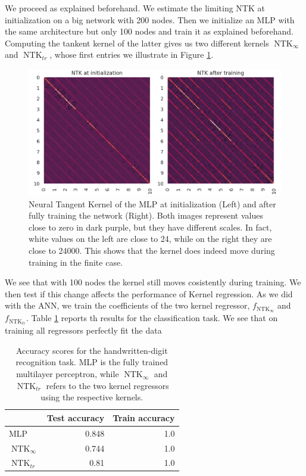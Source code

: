 \documentclass[11pt,notitlepage]{article}
\numberwithin{equation}{section}
\DeclareMathOperator{\NTK}{NTK}
\theoremstyle{remark}
\theoremstyle{definition}
\begin{document}
	We proceed as explained beforehand.
	We estimate the limiting NTK at initialization on a big network with 200 nodes.
	Then we initialize an MLP with the same architecture but only 100 nodes and train it as explained beforehand.
	Computing the tankent kernel of the latter gives us two different kernels $\NTK_\infty$ and $\NTK_{tr}$, whose first entries we illustrate in Figure \ref{fig:ntk_before_after_tr}.
	\begin{figure}
		\includegraphics[width=\linewidth]{../Simulations/figures/ntk_before_after_tr.png}
		\caption{Neural Tangent Kernel of the MLP at initialization (Left) and after fully training the network (Right).
		Both images represent values close to zero in dark purple, but they have different scales.
	In fact, white values on the left are close to 24, while on the right they are close to 24000.
    This shows that the kernel does indeed move during training in the finite case.}
		\label{fig:ntk_before_after_tr}		
	\end{figure}

    We see that with 100 nodes the kernel still moves cosistently during training.
    We then test if this change affects the performance of Kernel regression.
    As we did with the ANN, we train the coefficients of the two kernel regressor, $f_{\NTK_\infty}$ and $f_{\NTK_{tr}}$.
    Table \ref{tab:ntkScores} reports th results for the classification task.
    We see that on training all regressors perfectly fit the data 
	
	\begin{table}[h!]
		\centering
		\begin{tabular}{l|r|r}
			 & Test accuracy & Train accuracy\\
			 \hline
			 MLP & 0.848 & 1.0 \\
			 $\NTK_\infty$ & 0.744 & 1.0 \\
			 $\NTK_{tr}$ & 0.81 & 1.0
		\end{tabular}
	\caption{Accuracy scores for the handwritten-digit recognition task. MLP is the fully trained multilayer perceptron, while $\NTK_\infty$ and $\NTK_{tr}$ refers to the two kernel regressors using the respective kernels.}
	\label{tab:ntkScores}
	\end{table}
	
\end{document}
